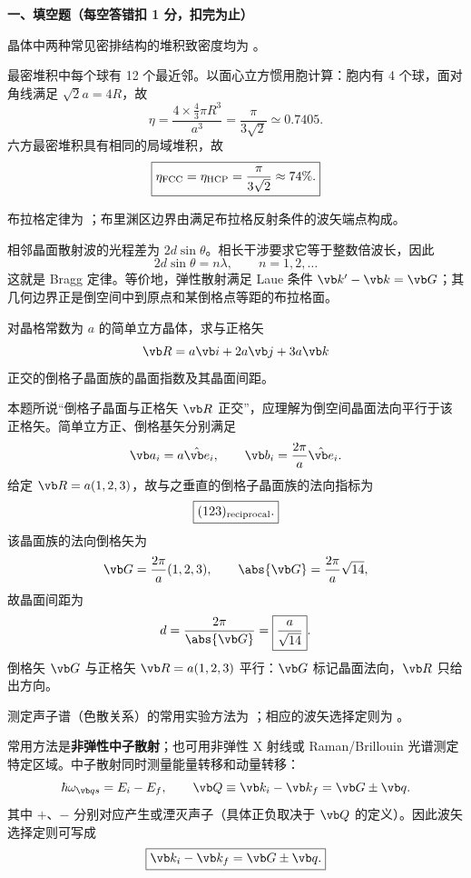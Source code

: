 
\textbf{一、填空题（每空答错扣 1 分，扣完为止）}

\begin{question}
晶体中两种常见密排结构的堆积致密度均为 \blank。


\begin{solution}
最密堆积中每个球有 12 个最近邻。以面心立方惯用胞计算：胞内有 4 个球，面对角线满足 $\sqrt2a=4R$，故
\[
 \eta=\frac{4\times\frac43\pi R^3}{a^3}
 =\frac{\pi}{3\sqrt2}\simeq0.7405.
\]
六方最密堆积具有相同的局域堆积，故
\[
 \boxed{\eta_{\rm FCC}=\eta_{\rm HCP}=\frac{\pi}{3\sqrt2}\approx74\%.}
\]
\end{solution}
\end{question}

\begin{question}
布拉格定律为 \blank；布里渊区边界由满足布拉格反射条件的波矢端点构成。


\begin{solution}
相邻晶面散射波的光程差为 $2d\sin\theta$。相长干涉要求它等于整数倍波长，因此
\[
 \boxed{2d\sin\theta=n\lambda,\qquad n=1,2,\ldots}
\]
这就是 Bragg 定律。等价地，弹性散射满足 Laue 条件
$\vb k'-\vb k=\vb G$；其几何边界正是倒空间中到原点和某倒格点等距的布拉格面。
\end{solution}
\end{question}

\begin{question}
对晶格常数为 $a$ 的简单立方晶体，求与正格矢
\[
  \vb R=a\vb i+2a\vb j+3a\vb k
\]
正交的倒格子晶面族的晶面指数及其晶面间距。


\begin{solution}
本题所说“倒格子晶面与正格矢 $\vb R$ 正交”，应理解为倒空间晶面法向平行于该正格矢。简单立方正、倒格基矢分别满足
\[
 \vb a_i=a\hat{\vb e}_i,
 \qquad \vb b_i=\frac{2\pi}{a}\hat{\vb e}_i.
\]
给定
$\vb R=a(1,2,3)$，故与之垂直的倒格子晶面族的法向指标为
\[
 \boxed{(123)_{\rm reciprocal}.}
\]
该晶面族的法向倒格矢为
\[
 \vb G=\frac{2\pi}{a}(1,2,3),\qquad
 \abs{\vb G}=\frac{2\pi}{a}\sqrt{14},
\]
故晶面间距为
\[
 d=\frac{2\pi}{\abs{\vb G}}
 =\boxed{\frac{a}{\sqrt{14}}}.
\]
倒格矢 $\vb G$ 与正格矢 $\vb R=a(1,2,3)$ 平行：$\vb G$ 标记晶面法向，$\vb R$ 只给出方向。
\end{solution}
\end{question}

\begin{question}
测定声子谱（色散关系）的常用实验方法为 \blank；相应的波矢选择定则为 \blank。


\begin{solution}
常用方法是\textbf{非弹性中子散射}；也可用非弹性 X 射线或 Raman/Brillouin 光谱测定特定区域。中子散射同时测量能量转移和动量转移：
\[
 \hbar\omega_{\vb q s}=E_i-E_f,
 \qquad
 \vb Q\equiv\vb k_i-\vb k_f=\vb G\pm\vb q.
\]
其中 $+$、$-$ 分别对应产生或湮灭声子（具体正负取决于 $\vb Q$ 的定义）。因此波矢选择定则可写成
\[
 \boxed{\vb k_i-\vb k_f=\vb G\pm\vb q.}
\]
\end{solution}
\end{question}

